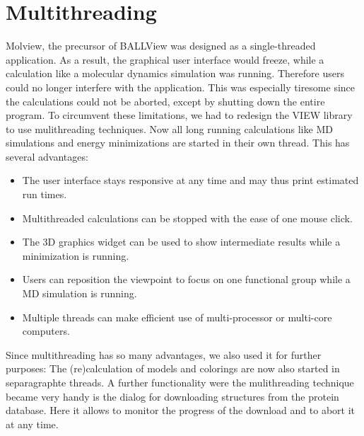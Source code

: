 \section{Multithreading}\label{mthread}
Molview, the precursor of BALLView was designed as a single-threaded application. 
As a result, the graphical user interface would freeze, while a calculation like a 
molecular dynamics simulation was running.
Therefore users could no longer interfere with the application.
This was especially tiresome since the calculations could not be aborted, except by 
shutting down the entire program.
To circumvent these limitations, we had to redesign the VIEW library to use mulithreading 
techniques.
Now all long running calculations like MD simulations and energy minimizations are 
started in their own thread.
This has several advantages:
\begin{itemize}
  \item The user interface stays responsive at any time and may thus \eg print
        estimated run times.
  \item Multithreaded calculations can be stopped with the ease of one mouse
        click.
  \item The 3D graphics widget can be used to show intermediate results \eg 
        while a minimization is running.
  \item Users can reposition the viewpoint \eg to focus on one functional group
        while a MD simulation is running.
  \item Multiple threads can make efficient use of multi-processor or multi-core
        computers.
\end{itemize}
Since multithreading has so many advantages, we also used it for further purposes:
The (re)calculation of models and colorings are now also started in separagraphte threads.
A further functionality were the mulithreading technique became very handy is the dialog for 
downloading structures from the protein database. 
Here it allows to monitor the progress of the download and to abort it at any time.

